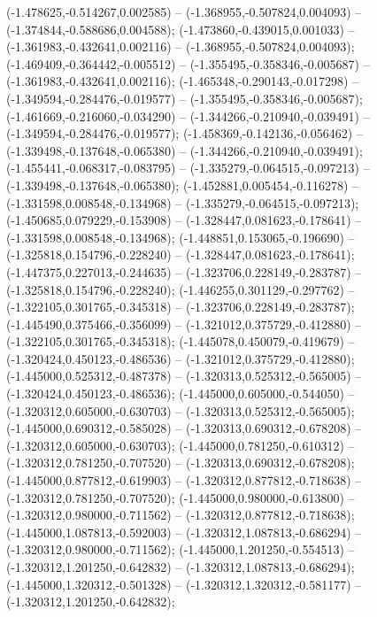  (-1.478625,-0.514267,0.002585) -- (-1.368955,-0.507824,0.004093) -- (-1.374844,-0.588686,0.004588);
 (-1.473860,-0.439015,0.001033) -- (-1.361983,-0.432641,0.002116) -- (-1.368955,-0.507824,0.004093);
 (-1.469409,-0.364442,-0.005512) -- (-1.355495,-0.358346,-0.005687) -- (-1.361983,-0.432641,0.002116);
 (-1.465348,-0.290143,-0.017298) -- (-1.349594,-0.284476,-0.019577) -- (-1.355495,-0.358346,-0.005687);
 (-1.461669,-0.216060,-0.034290) -- (-1.344266,-0.210940,-0.039491) -- (-1.349594,-0.284476,-0.019577);
 (-1.458369,-0.142136,-0.056462) -- (-1.339498,-0.137648,-0.065380) -- (-1.344266,-0.210940,-0.039491);
 (-1.455441,-0.068317,-0.083795) -- (-1.335279,-0.064515,-0.097213) -- (-1.339498,-0.137648,-0.065380);
 (-1.452881,0.005454,-0.116278) -- (-1.331598,0.008548,-0.134968) -- (-1.335279,-0.064515,-0.097213);
 (-1.450685,0.079229,-0.153908) -- (-1.328447,0.081623,-0.178641) -- (-1.331598,0.008548,-0.134968);
 (-1.448851,0.153065,-0.196690) -- (-1.325818,0.154796,-0.228240) -- (-1.328447,0.081623,-0.178641);
 (-1.447375,0.227013,-0.244635) -- (-1.323706,0.228149,-0.283787) -- (-1.325818,0.154796,-0.228240);
 (-1.446255,0.301129,-0.297762) -- (-1.322105,0.301765,-0.345318) -- (-1.323706,0.228149,-0.283787);
 (-1.445490,0.375466,-0.356099) -- (-1.321012,0.375729,-0.412880) -- (-1.322105,0.301765,-0.345318);
 (-1.445078,0.450079,-0.419679) -- (-1.320424,0.450123,-0.486536) -- (-1.321012,0.375729,-0.412880);
 (-1.445000,0.525312,-0.487378) -- (-1.320313,0.525312,-0.565005) -- (-1.320424,0.450123,-0.486536);
 (-1.445000,0.605000,-0.544050) -- (-1.320312,0.605000,-0.630703) -- (-1.320313,0.525312,-0.565005);
 (-1.445000,0.690312,-0.585028) -- (-1.320313,0.690312,-0.678208) -- (-1.320312,0.605000,-0.630703);
 (-1.445000,0.781250,-0.610312) -- (-1.320312,0.781250,-0.707520) -- (-1.320313,0.690312,-0.678208);
 (-1.445000,0.877812,-0.619903) -- (-1.320312,0.877812,-0.718638) -- (-1.320312,0.781250,-0.707520);
 (-1.445000,0.980000,-0.613800) -- (-1.320312,0.980000,-0.711562) -- (-1.320312,0.877812,-0.718638);
 (-1.445000,1.087813,-0.592003) -- (-1.320312,1.087813,-0.686294) -- (-1.320312,0.980000,-0.711562);
 (-1.445000,1.201250,-0.554513) -- (-1.320312,1.201250,-0.642832) -- (-1.320312,1.087813,-0.686294);
 (-1.445000,1.320312,-0.501328) -- (-1.320312,1.320312,-0.581177) -- (-1.320312,1.201250,-0.642832);
